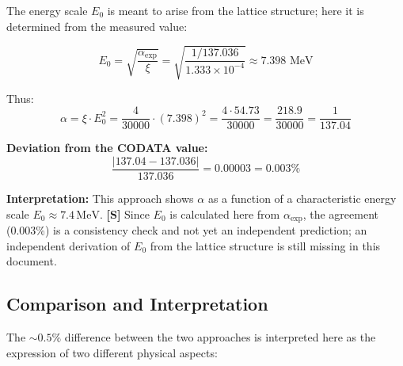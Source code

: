 	The energy scale \(E_0\) is meant to arise from the lattice structure; here it is determined from the measured value:
	
	\begin{equation}
		E_0 = \sqrt{\frac{\alpha_{\exp}}{\xi}} = \sqrt{\frac{1/137.036}{1.333 \times 10^{-4}}} \approx 7.398 \text{ MeV}
	\end{equation}
	
	Thus:
	\begin{equation}
		\alpha = \xi \cdot E_0^2 = \frac{4}{30000} \cdot (7.398)^2 = \frac{4 \cdot 54.73}{30000} = \frac{218.9}{30000} = \frac{1}{137.04}
	\end{equation}
	
	\textbf{Deviation from the CODATA value:}
	\begin{equation}
		\frac{|137.04 - 137.036|}{137.036} = 0.00003 = 0.003\%
	\end{equation}
	
	\textbf{Interpretation:} This approach shows \(\alpha\) as a function of a characteristic energy scale \(E_0 \approx 7.4\,\text{MeV}\). \textbf{[S]} Since \(E_0\) is calculated here from \(\alpha_{\exp}\), the agreement (0.003\%) is a consistency check and not yet an independent prediction; an independent derivation of \(E_0\) from the lattice structure is still missing in this document.
	
	\subsection{Comparison and Interpretation}
	
	\begin{table}[h!]
		\centering
		\caption{Comparison of the two theoretical T0 approaches with the experimental value.}
	\end{table}
	
	The \(\sim0.5\%\) difference between the two approaches is interpreted here as the expression of two different physical aspects:
	
